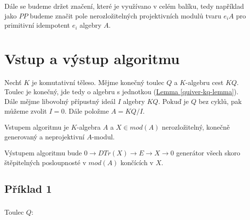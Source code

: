     Dále se budeme držet značení, které je využívano v celém \cite{QPA} balíku, 
    tedy například jako $PP$ budeme značit pole nerozložitelných projektivních 
    modulů tvaru $e_iA$ pro primitivní idempotent $e_i$ algebry $A$.

  \section{Vstup a výstup algoritmu}
  

      \paragraph { } Nechť $K$ je komutativní těleso. 
      Mějme konečný toulec $Q$ a $K$-algebru cest $KQ$.
      Toulec je konečný, jde tedy o algebru s jednotkou (\hyperref[quiver-kq-lemma]{Lemma \ref*{quiver-kq-lemma}}). 
      Dále mějme libovolný přípustný ideál $I$ algebry $KQ$. Pokuď je $Q$ bez 
      cyklů, pak můžeme zvolit $I=0$. Dále položme $A=KQ/I$.
      
      Vstupem algoritmu je  $K$-algebra $A$  
      a $X\in mod(A)$ nerozložitelný, konečně generovaný a neprojektivní $A$-modul.
      
      Výstupem algoritmu bude $0\rightarrow DTr(X)\rightarrow E\rightarrow X\rightarrow 0$ 
      generátor všech skoro štěpitelných posloupnosté v $mod(A)$ končících v $X$.
    
      \subsection*{Příklad 1}
        \subparagraph{}
        \centerline{
          Toulec $Q$: 
         }
  
